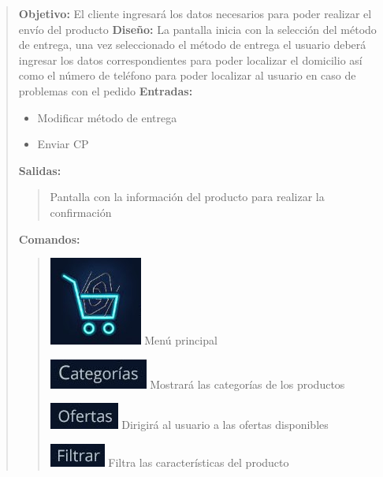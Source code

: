 \documentclass[14pt]{article}
\begin{document}
                \begin{quote}
                    \textbf{Objetivo:} El cliente ingresará los datos necesarios para poder realizar el envío del producto
                    \textbf{Diseño:} La pantalla inicia con la selección del método de entrega, una vez seleccionado el método de entrega el usuario deberá ingresar los datos correspondientes para poder localizar el domicilio así como el número de teléfono para poder localizar al usuario en caso de problemas con el pedido
                    \textbf{Entradas:} 
                        \begin{itemize}
                            \item Modificar método de entrega
                            \item Enviar CP
                        \end{itemize}
                    \textbf{Salidas:}
                        \begin{quote}
                            Pantalla con la información del producto para realizar la confirmación
                        \end{quote}
                    \textbf{Comandos:}
                        \begin{quote}
                            \includegraphics[height=0.02\textwidth]{BotonMenuPrincipal.jpg}
                            \label{P6:BotonMenuPrincipal} Menú principal
                           
                            \includegraphics[height=0.02\textwidth]{BotonCategorias.jpg}
                            \label{P6:BotonCategorias} Mostrará las categorías de los productos
                           
                            \includegraphics[height=0.02\textwidth]{BotonOfertas.jpg}
                            \label{P6:BotonOfertas} Dirigirá al usuario a las ofertas disponibles
                            
                            \includegraphics[height=0.02\textwidth]{BotonFiltrar.jpg}
                            \label{P6:BotonFiltrar} Filtra las características del producto
                            

\end{quote}
\end{quote}
\end{document}
